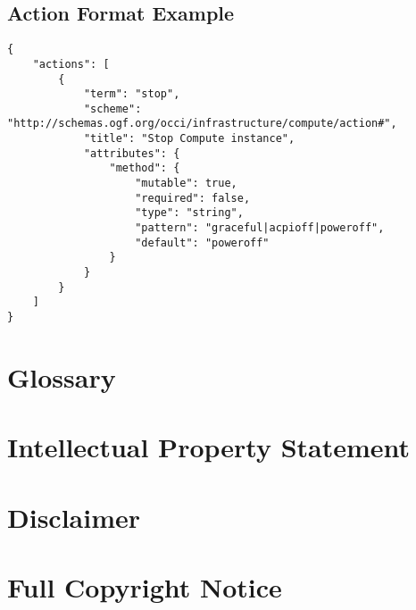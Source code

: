 \documentclass[10pt,a4paper]{article}
\begin{document}
\subsection{Action Format Example}
\label{sec:example_action}

\begin{verbatim}
{
    "actions": [
        {
            "term": "stop",
            "scheme": "http://schemas.ogf.org/occi/infrastructure/compute/action#",
            "title": "Stop Compute instance",
            "attributes": {
                "method": {
                    "mutable": true,
                    "required": false,
                    "type": "string",
                    "pattern": "graceful|acpioff|poweroff",
                    "default": "poweroff"
                }
            }
        }
    ]
}
\end{verbatim}

\section{Glossary}
\label{sec:glossary}


%

\section{Intellectual Property Statement}


\section{Disclaimer}


\section{Full Copyright Notice}




\end{document}
